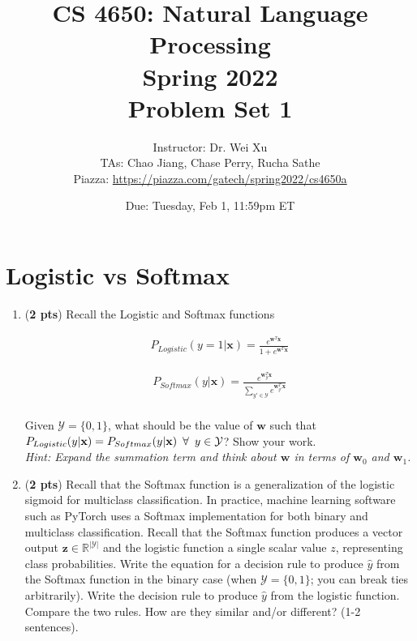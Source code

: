 \documentclass[11pt, letterpaper]{article}
\begin{document}
\title{CS 4650: Natural Language Processing \\ Spring 2022 \\ Problem Set 1}
\author{Instructor: Dr. Wei Xu \\ TAs: Chao Jiang, Chase Perry, Rucha Sathe \\Piazza: \url{https://piazza.com/gatech/spring2022/cs4650a}}
\date{Due: Tuesday, Feb 1, 11:59pm ET}
\maketitle

\section{Logistic vs Softmax}

    \begin{enumerate}[label=(\alph*)]
        \item (\textbf{2 pts}) Recall the Logistic and Softmax functions
        
    \begin{align*}
        P_{Logistic}(y=1|\mathbf{x}) = \frac{e^{\mathbf{w}^T\mathbf{x}}}{1 + e^{\mathbf{w}^T\mathbf{x}}}
    \end{align*}
    
    \begin{align*}
        P_{Softmax}(y|\mathbf{x}) = \frac{e^{\mathbf{w}_y^T\mathbf{x}}}{\sum_{y' \in \mathcal{Y}} e^{\mathbf{w}_{y'}^T\mathbf{x}}} \\
    \end{align*}
    
    Given $\mathcal{Y} = \{0,1\}$, what should be the value of $\mathbf{w}$ such that \\ $P_{Logistic}(y|\textbf{x}) = P_{Softmax}(y|\textbf{x}) \hspace{0.5em} \forall \hspace{0.5em} y \in \mathcal{Y}$? Show your work. \\
    \textit{Hint: Expand the summation term and think about $\mathbf{w}$ in terms of $\mathbf{w}_0$ and $\mathbf{w}_1$.}
    
    
    \item (\textbf{2 pts}) Recall that the Softmax function is a generalization of the logistic sigmoid for multiclass classification. In practice, machine learning software such as PyTorch uses a Softmax implementation for both binary and multiclass classification. Recall that the Softmax function produces a vector output $\mathbf{z} \in \mathbb{R}^{|\mathcal{Y}|}$ and the logistic function a single scalar value $z$, representing class probabilities. Write the equation for a decision rule to produce $\hat{y}$ from the Softmax function in the binary case (when $\mathcal{Y} = \{0,1\}$; you can break ties arbitrarily).
    Write the decision rule to produce $\hat{y}$ from the logistic function. Compare the two rules. How are they similar and/or different? (1-2 sentences).
    \end{enumerate}
    
\end{document}

